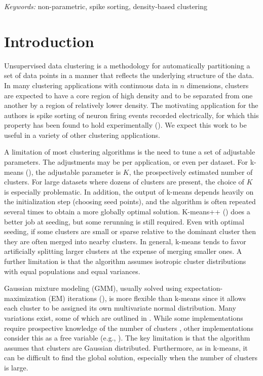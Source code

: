 \documentclass[10pt]{article}
\begin{document}
\noindent%
{\it Keywords:}  non-parametric, spike sorting, density-based clustering
\vfill

\newpage
{} %

\section {Introduction}

Unsupervised data clustering is a methodology for automatically partitioning a set of data points in a manner that reflects the underlying structure of the data. In many clustering applications with continuous data in $n$ dimensions, clusters are expected to have a core region of high density and to be separated from one another by a region of relatively lower density. The motivating application for the authors is spike sorting of neuron firing events recorded electrically, for which this property has been found to hold experimentally (\cite{tiganj,vargas}). We expect this work to be useful in a variety of other clustering applications.

A limitation of most clustering algorithms is the need to tune a set of adjustable parameters. The adjustments may be per application, or even per dataset. For k-means (\cite{kmeans}), the adjustable parameter is $K$, the prospectively estimated number of clusters. For large datasets where dozens of clusters are present, the choice of $K$ is especially problematic. In addition, the output of k-means depends heavily on the initialization step (choosing seed points), and the algorithm is often repeated several times to obtain a more globally optimal solution. K-means++ (\cite{kmeanspp}) does a better job at seeding, but some rerunning is still required. Even with optimal seeding, if some clusters are small or sparse relative to the dominant cluster then they are often merged into nearby clusters. In general, k-means tends to favor artificially splitting larger clusters at the expense of merging smaller ones. A further limitation is that the algorithm assumes isotropic cluster distributions with equal populations and equal variances.

Gaussian mixture modeling (GMM), usually solved using expectation-maximization (EM) iterations (\cite{em}), is more flexible than k-means since it allows each cluster to be assigned its own multivariate normal distribution. Many variations exist, some of which are outlined in \cite[Ch.~11]{murphy}. While some implementations require prospective knowledge of the number of clusters \cite[Ch.~8]{mixturemodels}, other implementations consider this as a free variable (e.g., \cite{roberts1998bayesian}). The key limitation is that the algorithm assumes that clusters are Gaussian distributed. Furthermore, as in k-means, it can be difficult to find the global solution, especially when the number of clusters is large.
\end{document}
